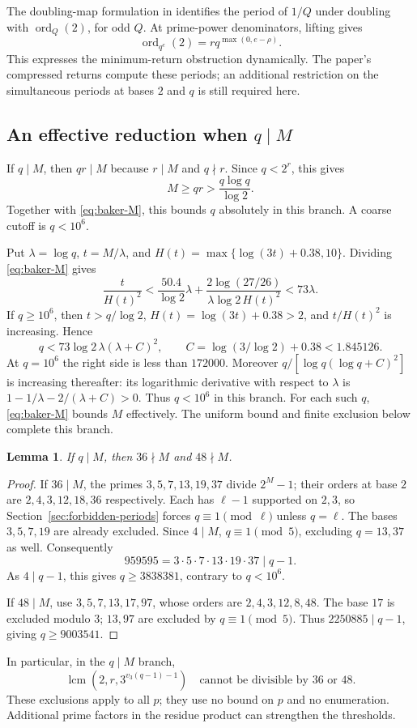 \documentclass[11pt]{article}
\newtheorem{lemma}{Lemma}
\begin{document}
The doubling-map formulation in \cite[Theorem A and \S4]{AGJ26}
identifies the period of $1/Q$ under doubling with
$\operatorname{ord}_Q(2)$, for odd $Q$. At prime-power denominators,
lifting gives
\[
\operatorname{ord}_{q^e}(2)=r q^{\max(0,e-\rho)}.
\]
This expresses the minimum-return obstruction dynamically. The paper's
compressed returns compute these periods; an additional restriction on
the simultaneous periods at bases $2$ and $q$ is still required here.

\subsection{\texorpdfstring{An effective reduction when $q\mid M$}{An effective reduction when q divides  M}}

If $q\mid M$, then $qr\mid M$ because $r\mid M$ and $q\nmid r$.
Since $q<2^r$, this gives
\[
M\geq qr>\frac{q\log q}{\log2}.
\]
Together with \eqref{eq:baker-M}, this bounds $q$ absolutely in this branch.
A coarse cutoff is $q<10^6$.

Put $\lambda=\log q$, $t=M/\lambda$, and
$H(t)=\max\{\log(3t)+0.38,10\}$. Dividing \eqref{eq:baker-M} gives
\[
\frac{t}{H(t)^2}
 <\frac{50.4}{\log2}\lambda
   +\frac{2\log(27/26)}{\lambda\log2\,H(t)^2}
 <73\lambda.
\]
If $q\geq10^6$, then $t>q/\log2$, $H(t)=\log(3t)+0.38>2$,
and $t/H(t)^2$ is increasing. Hence
\[
q<73\log2\,\lambda(\lambda+C)^2,
\qquad C=\log(3/\log2)+0.38<1.845126.
\]
At $q=10^6$ the right side is less than $172000$.
Moreover $q/[\log q(\log q+C)^2]$ is increasing thereafter:
its logarithmic derivative with respect to $\lambda$ is
$1-1/\lambda-2/(\lambda+C)>0$.
Thus $q<10^6$ in this branch. For each such $q$,
\eqref{eq:baker-M} bounds $M$ effectively. The uniform bound and
finite exclusion below complete this branch.

\begin{lemma}
If $q\mid M$, then $36\nmid M$ and $48\nmid M$.
\end{lemma}
\begin{proof}
If $36\mid M$, the primes $3,5,7,13,19,37$ divide $2^M-1$;
their orders at base $2$ are $2,4,3,12,18,36$ respectively.
Each has $\ell-1$ supported on $2,3$, so
Section~\ref{sec:forbidden-periods} forces $q\equiv1\pmod\ell$
unless $q=\ell$. The bases $3,5,7,19$ are already excluded.
Since $4\mid M$, $q\equiv1\pmod5$, excluding $q=13,37$ as well.
Consequently
\[
959595=3\cdot5\cdot7\cdot13\cdot19\cdot37\mid q-1.
\]
As $4\mid q-1$, this gives $q\ge3838381$, contrary to $q<10^6$.

If $48\mid M$, use $3,5,7,13,17,97$, whose orders are
$2,4,3,12,8,48$. The base $17$ is excluded modulo $3$;
$13,97$ are excluded by $q\equiv1\pmod5$.
Thus $2250885\mid q-1$, giving $q\ge9003541$.
\end{proof}
In particular, in the $q\mid M$ branch,
\[
\operatorname{lcm}(2,r,3^{v_3(q-1)-1})
\quad\text{cannot be divisible by }36\text{ or }48.
\]
These exclusions apply to all $p$; they use no bound on $p$ and no
enumeration. Additional prime factors in the residue product can
strengthen the thresholds.
\end{document}
